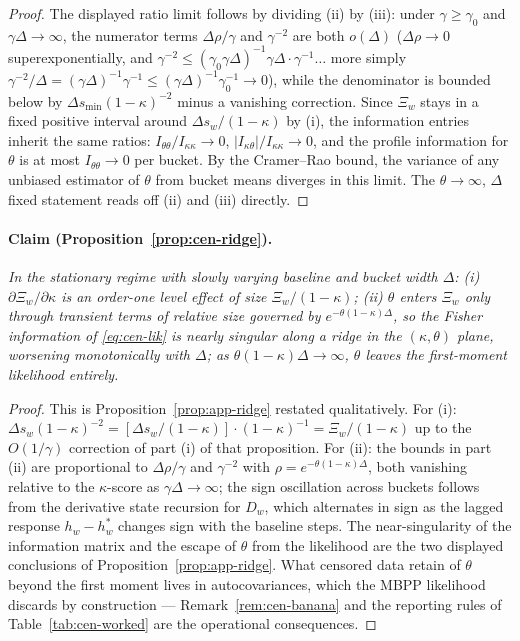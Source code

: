\begin{proof}
The displayed ratio limit follows by dividing (ii) by (iii): under $\gamma \ge \gamma_0$ and
$\gamma\Delta \to \infty$, the numerator terms $\Delta\rho/\gamma$ and $\gamma^{-2}$ are both
$o(\Delta)$ ($\Delta\rho \to 0$ superexponentially, and $\gamma^{-2} \le (\gamma_0
\gamma\Delta)^{-1}\gamma\Delta\cdot\gamma^{-1}\ldots$ more simply $\gamma^{-2}/\Delta =
(\gamma\Delta)^{-1}\gamma^{-1} \le (\gamma\Delta)^{-1}\gamma_0^{-1} \to 0$), while the denominator
is bounded below by $\Delta s_{\min}(1-\kappa)^{-2}$ minus a vanishing correction. Since $\Xi_w$
stays in a fixed positive interval around $\Delta s_w/(1-\kappa)$ by (i), the information entries
inherit the same ratios: $I_{\theta\theta}/I_{\kappa\kappa} \to 0$,
$|I_{\kappa\theta}|/I_{\kappa\kappa} \to 0$, and the profile information for $\theta$ is at most
$I_{\theta\theta} \to 0$ per bucket. By the Cramer--Rao bound, the variance of any unbiased
estimator of $\theta$ from bucket means diverges in this limit. The $\theta \to \infty$, $\Delta$
fixed statement reads off (ii) and (iii) directly.
\end{proof}

\paragraph{Claim (Proposition~\ref{prop:cen-ridge}).}
\emph{In the stationary regime with slowly varying baseline and bucket width $\Delta$: (i) $\partial
\Xi_w/\partial\kappa$ is an order-one level effect of size $\Xi_w/(1-\kappa)$; (ii) $\theta$ enters
$\Xi_w$ only through transient terms of relative size governed by $e^{-\theta(1-\kappa)\Delta}$, so
the Fisher information of \eqref{eq:cen-lik} is nearly singular along a ridge in the $(\kappa,
\theta)$ plane, worsening monotonically with $\Delta$; as $\theta(1-\kappa)\Delta \to \infty$,
$\theta$ leaves the first-moment likelihood entirely.}

\begin{proof}
This is Proposition~\ref{prop:app-ridge} restated qualitatively. For (i): $\Delta s_w
(1-\kappa)^{-2} = [\Delta s_w/(1-\kappa)] \cdot (1-\kappa)^{-1} = \Xi_w/(1-\kappa)$ up to the
$O(1/\gamma)$ correction of part (i) of that proposition. For (ii): the bounds in part (ii) are
proportional to $\Delta\rho/\gamma$ and $\gamma^{-2}$ with $\rho = e^{-\theta(1-\kappa)\Delta}$,
both vanishing relative to the $\kappa$-score as $\gamma\Delta \to \infty$; the sign oscillation
across buckets follows from the derivative state recursion for $D_w$, which alternates in sign as
the lagged response $h_w - h_w^\ast$ changes sign with the baseline steps. The near-singularity of
the information matrix and the escape of $\theta$ from the likelihood are the two displayed
conclusions of Proposition~\ref{prop:app-ridge}. What censored data retain of $\theta$ beyond the
first moment lives in autocovariances, which the MBPP likelihood discards by construction ---
Remark~\ref{rem:cen-banana} and the reporting rules of Table~\ref{tab:cen-worked} are the
operational consequences.
\end{proof}

